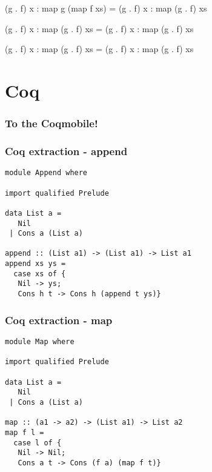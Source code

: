 \documentclass{beamer}
\begin{document}
\begin{frame}[t,fragile]
\begin{center}
\begin{flushleft}
\begin{overprint}
\begin{semiverbatim}
(g . f) x : \alert{map g (map f xs)} = (g . f) x : map (g . f) xs
\end{semiverbatim}

\begin{semiverbatim}
(g . f) x : \alert{map (g . f) xs}   = (g . f) x : map (g . f) xs
\end{semiverbatim}

\begin{semiverbatim}
\alert<42>{(g . f) x : map (g . f) xs}   = \alert<42>{(g . f) x : map (g . f) xs}
\end{semiverbatim}

\end{overprint}
\end{flushleft}
\end{center}

\end{frame}

\section{Coq}

\begin{frame}
    \frametitle {To the Coqmobile!}
\end{frame}

\begin{frame}[t,fragile]
    \frametitle {Coq extraction - append}
\begin{verbatim}
module Append where

import qualified Prelude

data List a =
   Nil
 | Cons a (List a)

append :: (List a1) -> (List a1) -> List a1
append xs ys =
  case xs of {
   Nil -> ys;
   Cons h t -> Cons h (append t ys)}
\end{verbatim}
\end{frame}

\begin{frame}[t,fragile]
    \frametitle {Coq extraction - map}
\begin{verbatim}
module Map where

import qualified Prelude

data List a =
   Nil
 | Cons a (List a)

map :: (a1 -> a2) -> (List a1) -> List a2
map f l =
  case l of {
   Nil -> Nil;
   Cons a t -> Cons (f a) (map f t)}
\end{verbatim}
\end{frame}
\end{document}
